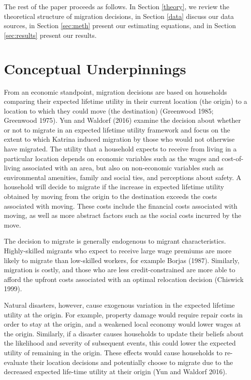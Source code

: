 \documentclass[]{article}
\begin{document}
The rest of the paper proceeds as follows. In Section \ref{theory}, we
review the theoretical structure of migration decisions, in Section
\ref{data} discuss our data sources, in Section \ref{sec:meth} present
our estimating equations, and in Section \ref{sec:results} present our
results.

\section{\texorpdfstring{Conceptual Underpinnings
\label{theory}}{Conceptual Underpinnings }}\label{conceptual-underpinnings}

From an economic standpoint, migration decisions are based on households
comparing their expected lifetime utility in their current location (the
origin) to a location to which they could move (the destination)
(Greenwood 1985; Greenwood 1975). Yun and Waldorf (2016) examine the
decision about whether or not to migrate in an expected lifetime utility
framework and focus on the extent to which Katrina induced migration by
those who would not otherwise have migrated. The utility that a
household expects to receive from living in a particular location
depends on economic variables such as the wages and cost-of-living
associated with an area, but also on non-economic variables such as
environmental amenities, family and social ties, and perceptions about
safety. A household will decide to migrate if the increase in expected
lifetime utility obtained by moving from the origin to the destination
exceeds the costs associated with moving. These costs include the
financial costs associated with moving, as well as more abstract factors
such as the social costs incurred by the move.

The decision to migrate is generally endogenous to migrant
characteristics. Highly-skilled migrants who expect to receive large
wage premiums are more likely to migrate than low-skilled workers, for
example Borjas (1987). Similarly, migration is costly, and those who are
less credit-constrained are more able to afford the upfront costs
associated with an optimal relocation decision (Chiswick 1999).

Natural disasters, however, cause exogenous variation in the expected
lifetime utility at the origin. For example, property damage would
require repair costs in order to stay at the origin, and a weakened
local economy would lower wages at the origin. Similarly, if a disaster
causes households to update their beliefs about the likelihood and
severity of subsequent events, this could lower the expected utility of
remaining in the origin. These effects would cause households to
re-evaluate their location decisions and potentially choose to migrate
due to the decreased expected life-time utility at their origin (Yun and
Waldorf 2016).
\end{document}
